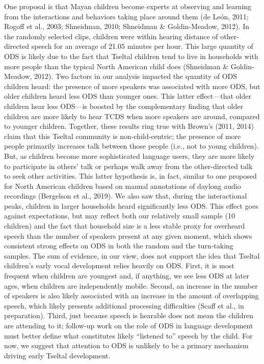 \documentclass[,man,floatsintext]{apa6}
\begin{document}
One proposal is that Mayan children become experts at observing and
learning from the interactions and behaviors taking place around them
(de León, 2011; Rogoff et al., 2003; Shneidman, 2010; Shneidman \&
Goldin-Meadow, 2012). In the randomly selected clips, children were
within hearing distance of other-directed speech for an average of 21.05
minutes per hour. This large quantity of ODS is likely due to the fact
that Tseltal children tend to live in households with more people than
the typical North American child does (Shneidman \& Goldin-Meadow,
2012). Two factors in our analysis impacted the quantity of ODS children
heard: the presence of more speakers was associated with more ODS, but
older children heard less ODS than younger ones. This latter
effect---that older children hear less ODS---is boosted by the
complementary finding that older children are more likely to hear TCDS
when more speakers are around, compared to younger children. Together,
these results ring true with Brown's (2011, 2014) claim that this
Tseltal community is non-child-centric; the presence of more people
primarily increases talk between those people (i.e., not to young
children). But, as children become more sophisticated language users,
they are more likely to participate in others' talk or perhaps walk away
from the other-directed talk to seek other activities. This latter
hypothesis is, in fact, similar to one proposed for North American
children based on manual annotations of daylong audio recordings
(Bergelson et al., 2019). We also saw that, during the interactional
peaks, children in larger households heard significantly less ODS. This
effect goes against expectations, but may reflect both our relatively
small sample (10 children) and the fact that household size is a less
stable proxy for overheard speech than the number of speakers present at
any given moment, which shows consistent strong effects on ODS in both
the random and the turn-taking samples. The sum of evidence, in our
view, does not support the idea that Tseltal children's early vocal
development relies heavily on ODS. First, it is most frequent when
children are youngest and, if anything, we see less ODS at later ages,
when children are independently mobile. Second, an increase in the
number of speakers is also likely associated with an increase in the
amount of overlapping speech, which likely presents additional
processing difficulties (Scaff et al., in preparation). Third, just
because speech is hearable does not mean the children are attending to
it; follow-up work on the role of ODS in language development must
better define what constitutes likely \enquote{listened to} speech by
the child. For now, we suggest that attention to ODS is unlikely to be a
primary mechanism driving early Tseltal development.
\end{document}
